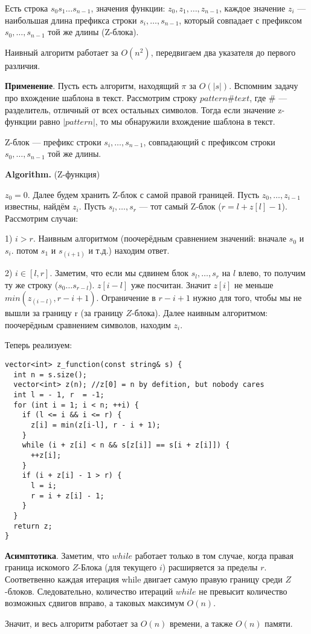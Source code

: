 \Def Есть строка $s_0 s_1 \dots s_{n-1}$, значения функции: $z_0, z_1, \dots, z_{n-1}$, каждое значение $z_i$ — наибольшая длина префикса строки $s_i, \dots, s_{n-1}$, который совпадает с префиксом $s_0, \dots, s_{n-1}$ той же длины (Z-блока).

Наивный алгоритм работает за $O(n^2)$, передвигаем два указателя до первого различия.

\textbf{Применение}. Пусть есть алгоритм, находящий $\pi$ за $O(|s|)$. Вспомним задачу про вхождение шаблона в текст. Рассмотрим строку $pattern \# text$, где $\#$ — разделитель, отличный от всех остальных символов. Тогда если значение z-функции равно $|pattern|$, то мы обнаружили вхождение шаблона в текст.

\Def Z-блок — префикс строки $s_i, \dots, s_{n-1}$, совпадающий с префиксом строки $s_0, \dots, s_{n-1}$ той же длины.

\textbf{Algorithm.} (Z-функция) 

$z_0 = 0$. Далее будем хранить Z-блок с самой правой границей. Пусть $z_0, \dots, z_{i-1}$ известны, найдём $z_i$. Пусть $s_l, \dots, s_r$ — тот самый Z-блок ($r = l + z[l] - 1$). Рассмотрим случаи:

1) $i > r$.
Наивным алгоритмом (поочерёдным сравнением значений: вначале $s_0$ и $s_i$. потом $s_1$ и $s_{(i+1)}$ и т.д.) находим ответ.

2) $i \in [l, r]$. Заметим, что если мы сдвинем блок $s_l, \dots, s_r$ на $l$ влево, то получим ту же строку ($s_{0} \dots s_{r-l}$). $z[i-l]$ уже посчитан. Значит $z[i]$ не меньше $min(z_{(i-l)}, r - i + 1)$. Ограничение в $r - i + 1$ нужно для того, чтобы мы не вышли за границу r (за границу $Z$-блока). Далее наивным алгоритмом: поочерёдным сравнением символов, находим $z_i$.

Теперь реализуем:

\begin{lstlisting}
vector<int> z_function(const string& s) {
  int n = s.size();
  vector<int> z(n); //z[0] = n by defition, but nobody cares
  int l = - 1, r  = -1;
  for (int i = 1; i < n; ++i) {
    if (l <= i && i <= r) {
      z[i] = min(z[i-l], r - i + 1);
    }
    while (i + z[i] < n && s[z[i]] == s[i + z[i]]) {
      ++z[i];
    }
    if (i + z[i] - 1 > r) {
      l = i;
      r = i + z[i] - 1;
    }
  }
  return z;
}
\end{lstlisting}

\textbf{Асимптотика}. Заметим, что $while$ работает только в том случае, когда правая граница искомого $Z$-Блока (для текущего $i$) расширяется за пределы $r$. Соответвенно каждая итерация while двигает самую правую границу среди $Z$-блоков. Следовательно, количество итераций $while$ не превысит количество возможных сдвигов вправо, а таковых максимум $O(n)$. 

Значит, и весь алгоритм работает за $O(n)$ времени, а также $O(n)$ памяти.
